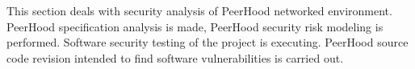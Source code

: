 %
%
This section deals with security analysis of PeerHood networked environment. 
%
PeerHood specification analysis is made, PeerHood security risk modeling is performed. 
%
Software security testing of the project is executing. 
%
PeerHood source code revision intended to find software vulnerabilities is carried out. 